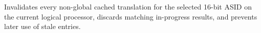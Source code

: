 Invalidates every non-global cached translation for the selected 16-bit ASID on the current logical processor, discards matching in-progress results, and prevents later use of stale entries.
